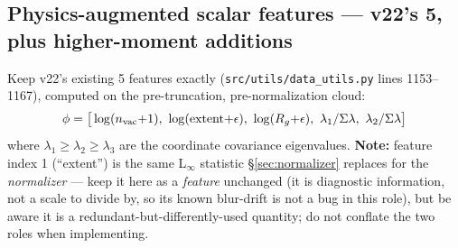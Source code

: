 \documentclass[11pt]{article}
\newcommand{\code}[1]{\texttt{#1}}
\begin{document}
\subsection{Physics-augmented scalar features --- v22's 5, plus higher-moment additions}
\label{sec:physfeat}
Keep v22's existing 5 features exactly (\code{src/utils/data\_utils.py} lines 1153--1167),
computed on the pre-truncation, pre-normalization cloud:
\[
  \phi = \big[\log(n_{\rm vac}{+}1),\ \log(\text{extent}{+}\epsilon),\
        \log(R_g{+}\epsilon),\ \lambda_1/\Sigma\lambda,\ \lambda_2/\Sigma\lambda \big]
\]
where $\lambda_1\ge\lambda_2\ge\lambda_3$ are the coordinate covariance eigenvalues.
\textbf{Note:} feature index 1 (``extent'') is the same L$_\infty$ statistic
\S\ref{sec:normalizer} replaces for the \emph{normalizer} --- keep it here as a
\emph{feature} unchanged (it is diagnostic information, not a scale to divide by, so its
known blur-drift is not a bug in this role), but be aware it is a redundant-but-differently-used
quantity; do not conflate the two roles when implementing.
\end{document}
